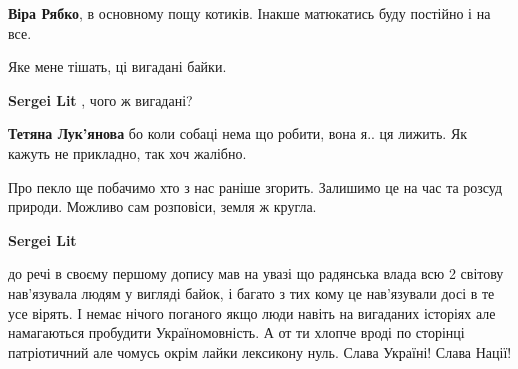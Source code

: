 \begin{itemize}
\begin{itemize}
\textbf{Віра Рябко}, в основному пощу котиків. Інакше матюкатись буду постійно і на все.
\end{itemize}

 
Яке мене тішать, ці вигадані байки.

\begin{itemize}
 
\textbf{Sergei Lit} , чого ж вигадані?

 
\textbf{Тетяна Лук'янова} бо коли собаці нема що робити, вона я.. ця лижить. Як кажуть не прикладно, так хоч жалібно.

 
Про пекло ще побачимо хто з нас раніше згорить. Залишимо це на час та розсуд природи. Можливо сам розповіси, земля ж кругла.

 
\textbf{Sergei Lit} 

до речі в своєму першому допису мав на увазі що радянська влада всю 2 світову
нав'язувала людям у вигляді байок, і багато з тих кому це нав'язували досі в те
усе вірять. І немає нічого поганого якщо люди навіть на вигаданих історіях але
намагаються пробудити Україномовність. А от ти хлопче вроді по сторінці
патріотичний але чомусь окрім лайки лексикону нуль. Слава Україні! Слава Нації!



\end{itemize}
\end{itemize}
